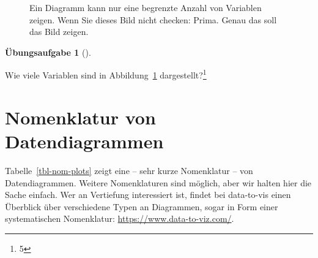 \documentclass[
  letterpaper,
  twoside,
  open=any]{scrbook}
\theoremstyle{definition}
\newtheorem{exercise}{Übungsaufgabe}[chapter]
\theoremstyle{definition}
\theoremstyle{definition}
\theoremstyle{remark}
\begin{document}
\begin{figure}


\caption{\label{fig-many-dims}Ein Diagramm kann nur eine begrenzte
Anzahl von Variablen zeigen. Wenn Sie dieses Bild nicht checken: Prima.
Genau das soll das Bild zeigen.}

\end{figure}%

\begin{exercise}[]\protect\hypertarget{exr-anz-dims}{}\label{exr-anz-dims}

Wie viele Variablen sind in Abbildung~\ref{fig-many-dims}
dargestellt?\footnote{5}

\end{exercise}

\section{Nomenklatur von
Datendiagrammen}\label{nomenklatur-von-datendiagrammen}

Tabelle~\ref{tbl-nom-plots} zeigt eine -- sehr kurze Nomenklatur -- von
Datendiagrammen. Weitere Nomenklaturen sind möglich, aber wir halten
hier die Sache einfach. Wer an Vertiefung interessiert ist, findet bei
data-to-vis einen Überblick über verschiedene Typen an Diagrammen, sogar
in Form einer systematischen Nomenklatur:
\url{https://www.data-to-viz.com/}.
\end{document}
